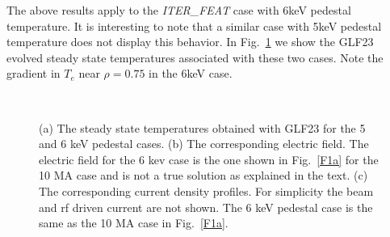 The above results apply to the  \emph{ITER\_FEAT} case with 6keV pedestal
temperature. It is interesting to note that a similar case with 5keV pedestal
temperature does not display this behavior. In Fig.~\ref{F2a} we show the GLF23
evolved steady state temperatures associated with these two cases. Note the 
gradient in $T_e$ near $\rho = 0.75 $ in the 6keV case.

\begin{figure}[hbt] %
 \centering  
 \centering   
 \mbox{} \\
 \vspace{.5in}
 \begin{narrow}{-.50in}{0in}
 \mbox{}
 \mbox{}
 \end{narrow}
 \caption{(a) The steady state temperatures obtained with GLF23 for the 5 and 6
 keV pedestal cases. (b) The corresponding electric field. The electric field
 for the 6 kev case is the one shown in Fig.~\ref{F1a} for the 10 MA case and is
 not a true solution as explained in the  text. (c) The corresponding  current
 density profiles. For simplicity the beam and rf  driven current are not shown.
 The 6 keV pedestal case is the same as the 10 MA case in Fig.~\ref{F1a}.}
 \label{F2a}
\end{figure}

